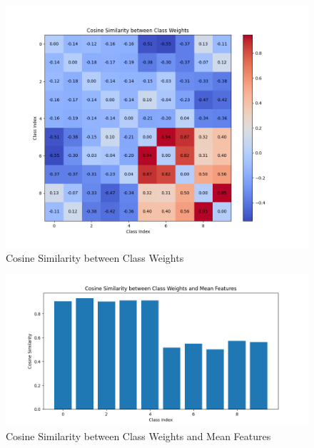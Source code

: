 \documentclass{article}
\begin{document}
\begin{multicols}{2}
\columnbreak
\begin{figure}[H]
\centering
\includegraphics[width=\linewidth]{Plot/CE/stage--1/cos_VS_5000_50_epoch_199.png}
\caption{Cosine Similarity between Class Weights}
\end{figure}
\begin{figure}[H]
\centering
\includegraphics[width=\linewidth]{Plot/CE/stage--1/Wi_Hi_cos_VS_5000_50_epoch_199.png}
\caption{Cosine Similarity between Class Weights and Mean Features}
\end{figure}

\end{multicols} %







\newpage
\end{document}
